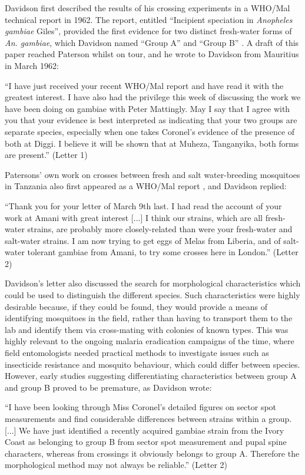 \documentclass[a4paper,11pt,abstracton,hidelinks]{scrartcl}
\begin{document}
Davidson first described the results of his crossing experiments in a WHO/Mal technical report in 1962.
%
The report, entitled ``Incipient speciation in \textit{Anopheles gambiae} Giles'', 
provided the first evidence for two distinct fresh-water forms of \textit{An. gambiae}, which Davidson named ``Group A'' and ``Group B'' \citep{Davidson1962a}.
%
A draft of this paper reached Paterson whilst on tour, and he wrote to Davidson from Mauritius in March 1962:
%
\begin{displayquote}
``I have just received your recent WHO/Mal report and have read it with the greatest interest.
%
I have also had the privilege this week of discussing the work we have been doing on gambiae with Peter Mattingly.
%
May I say that I agree with you that your evidence is best interpreted as indicating that your two groups are separate species, especially when one takes Coronel's evidence of the presence of both at Diggi.
%
I believe it will be shown that at Muheza, Tanganyika, both forms are present.'' (Letter 1)
\end{displayquote}


Patersons' own work on crosses between fresh and salt water-breeding mosquitoes in Tanzania also first appeared as a WHO/Mal report \citep{Paterson1962a}, and Davidson replied:
%
\begin{displayquote}
``Thank you for your letter of March 9th last. 
%
I had read the account of your work at Amani with great interest [...] I think our strains, which are all fresh-water strains, are probably more closely-related than were your fresh-water and salt-water strains.
%
I am now trying to get eggs of Melas from Liberia, and of salt-water tolerant gambiae from Amani, to try some crosses here in London.'' (Letter 2)
\end{displayquote}


Davidson's letter also discussed the search for morphological characteristics which could be used to distinguish the different species.
%
Such characteristics were highly desirable because, if they could be found, they would provide a means of identifying mosquitoes in the field, rather than having to transport them to the lab and identify them via cross-mating with colonies of known types.
%
This was highly relevant to the ongoing malaria eradication campaigns of the time, where field entomologists needed practical methods to investigate issues such as insecticide resistance and mosquito behaviour, which could differ between species.
%
However, early studies suggesting differentiating characteristics between group A and group B \citep{Coronel1962} proved to be premature, as Davidson wrote:
\begin{displayquote}
``I have been looking through Miss Coronel's detailed figures on sector spot measurements and find considerable differences between strains within a group.
%
[...] We have just identified a recently acquired gambiae strain from the Ivory Coast as belonging to group B from sector spot measurement and pupal spine characters, whereas from crossings it obviously belongs to group A.
%
Therefore the morphological method may not always be reliable.'' (Letter 2)
\end{displayquote}
\end{document}
